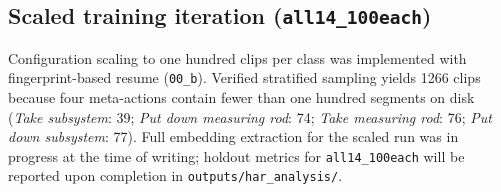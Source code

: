 \subsection{Scaled training iteration (\texttt{all14\_100each})}

Configuration scaling to one hundred clips per class was implemented with fingerprint-based resume (\texttt{00\_b}).
Verified stratified sampling yields \num{1266} clips because four meta-actions contain fewer than one hundred segments on disk (\emph{Take subsystem}: \num{39}; \emph{Put down measuring rod}: \num{74}; \emph{Take measuring rod}: \num{76}; \emph{Put down subsystem}: \num{77}).
Full embedding extraction for the scaled run was in progress at the time of writing; holdout metrics for \texttt{all14\_100each} will be reported upon completion in \texttt{outputs/har\_analysis/}.
